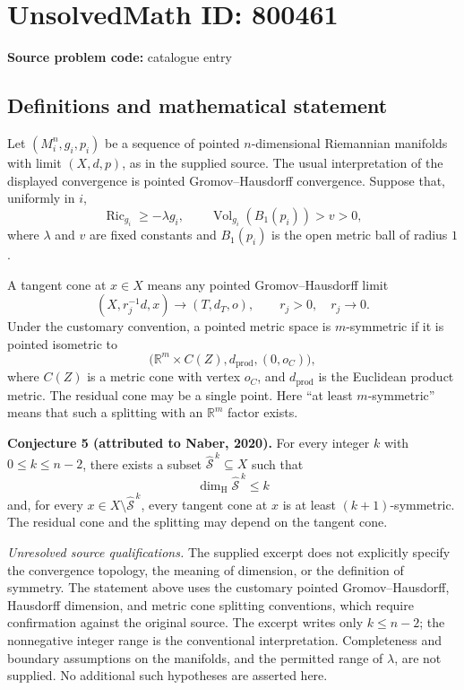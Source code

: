 \documentclass[11pt]{article}
\newcommand{\R}{\mathbb{R}}
\begin{document}
\section*{UnsolvedMath ID: 800461}
\textbf{Source problem code:} catalogue entry
\subsection{Definitions and mathematical statement}
Let \((M_i^n,g_i,p_i)\) be a sequence of pointed \(n\)-dimensional Riemannian manifolds with limit \((X,d,p)\), as in the supplied source. The usual interpretation of the displayed convergence is pointed Gromov--Hausdorff convergence. Suppose that, uniformly in \(i\),
\[
\operatorname{Ric}_{g_i}\geq -\lambda g_i,
\qquad
\operatorname{Vol}_{g_i}(B_1(p_i))>v>0,
\]
where \(\lambda\) and \(v\) are fixed constants and \(B_1(p_i)\) is the open metric ball of radius \(1\).

A tangent cone at \(x\in X\) means any pointed Gromov--Hausdorff limit
\[
(X,r_j^{-1}d,x)\longrightarrow (T,d_T,o),
\qquad r_j>0,\quad r_j\to0.
\]
Under the customary convention, a pointed metric space is \(m\)-symmetric if it is pointed isometric to
\[
\bigl(\R^m\times C(Z),d_{\mathrm{prod}},(0,o_C)\bigr),
\]
where \(C(Z)\) is a metric cone with vertex \(o_C\), and \(d_{\mathrm{prod}}\) is the Euclidean product metric. The residual cone may be a single point. Here ``at least \(m\)-symmetric'' means that such a splitting with an \(\R^m\) factor exists.

\textbf{Conjecture 5 (attributed to Naber, 2020).} For every integer \(k\) with \(0\leq k\leq n-2\), there exists a subset \(\widehat{\mathcal S}^{\,k}\subseteq X\) such that
\[
\dim_{\mathrm H}\widehat{\mathcal S}^{\,k}\leq k
\]
and, for every \(x\in X\setminus\widehat{\mathcal S}^{\,k}\), every tangent cone at \(x\) is at least \((k+1)\)-symmetric. The residual cone and the splitting may depend on the tangent cone.

\textit{Unresolved source qualifications.} The supplied excerpt does not explicitly specify the convergence topology, the meaning of dimension, or the definition of symmetry. The statement above uses the customary pointed Gromov--Hausdorff, Hausdorff dimension, and metric cone splitting conventions, which require confirmation against the original source. The excerpt writes only \(k\leq n-2\); the nonnegative integer range is the conventional interpretation. Completeness and boundary assumptions on the manifolds, and the permitted range of \(\lambda\), are not supplied. No additional such hypotheses are asserted here.
\end{document}
